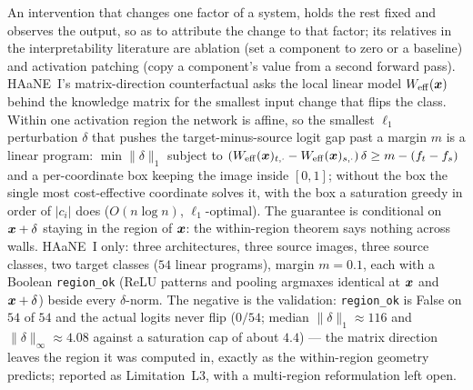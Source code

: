 {An intervention that changes one factor of a system, holds the rest fixed and observes the output, so as to attribute the change to that factor; its relatives in the interpretability literature are ablation (set a component to zero or a baseline) and activation patching (copy a component's value from a second forward pass). HAaNE~I's matrix-direction counterfactual asks the local linear model $W_{\mathrm{eff}}(\boldsymbol{x})$ behind the knowledge matrix for the smallest input change that flips the class.}
{Within one activation region the network is affine, so the smallest $\ell_1$ perturbation $\delta$ that pushes the target-minus-source logit gap past a margin $m$ is a linear program: $\min\|\delta\|_1$ subject to $(W_{\mathrm{eff}}(\boldsymbol{x})_{t,\cdot}-W_{\mathrm{eff}}(\boldsymbol{x})_{s,\cdot})\,\delta\ge m-(f_t-f_s)$ and a per-coordinate box keeping the image inside $[0,1]$; without the box the single most cost-effective coordinate solves it, with the box a saturation greedy in order of $|c_i|$ does ($O(n\log n)$, $\ell_1$-optimal). The guarantee is conditional on $\boldsymbol{x}+\delta$ staying in the region of $\boldsymbol{x}$: the within-region theorem says nothing across walls.}
{HAaNE~I only: three architectures, three source images, three source classes, two target classes ($54$ linear programs), margin $m=0.1$, each with a Boolean \texttt{region\_ok} (ReLU patterns and pooling argmaxes identical at $\boldsymbol{x}$ and $\boldsymbol{x}+\delta$) beside every $\delta$-norm.}
{The negative is the validation: \texttt{region\_ok} is False on $54$ of $54$ and the actual logits never flip ($0/54$; median $\|\delta\|_1\approx116$ and $\|\delta\|_\infty\approx4.08$ against a saturation cap of about $4.4$) --- the matrix direction leaves the region it was computed in, exactly as the within-region geometry predicts; reported as Limitation~L3, with a multi-region reformulation left open.}
